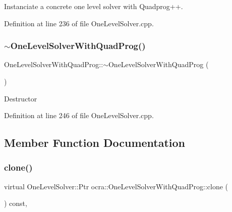 Instanciate a concrete one level solver with Quadprog++. 

Definition at line 236 of file One\+Level\+Solver.\+cpp.

\hypertarget{classocra_1_1OneLevelSolverWithQuadProg_a27d12b82fcaec15ca7041064bd7f9095}{}\label{classocra_1_1OneLevelSolverWithQuadProg_a27d12b82fcaec15ca7041064bd7f9095} 
\subsubsection{\texorpdfstring{$\sim$\+One\+Level\+Solver\+With\+Quad\+Prog()}{~OneLevelSolverWithQuadProg()}}
{\footnotesize\ttfamily One\+Level\+Solver\+With\+Quad\+Prog\+::$\sim$\+One\+Level\+Solver\+With\+Quad\+Prog (\begin{DoxyParamCaption}{ }\end{DoxyParamCaption})\hspace{0.3cm}{\ttfamily [virtual]}}

Destructor 

Definition at line 246 of file One\+Level\+Solver.\+cpp.



\subsection{Member Function Documentation}
\hypertarget{classocra_1_1OneLevelSolverWithQuadProg_a706e7772885ae7ab3e78565d51286eac}{}\label{classocra_1_1OneLevelSolverWithQuadProg_a706e7772885ae7ab3e78565d51286eac} 
\subsubsection{\texorpdfstring{clone()}{clone()}}
{\footnotesize\ttfamily virtual One\+Level\+Solver\+::\+Ptr ocra\+::\+One\+Level\+Solver\+With\+Quad\+Prog\+::clone (\begin{DoxyParamCaption}{ }\end{DoxyParamCaption}) const\hspace{0.3cm}{\ttfamily [inline]}, {\ttfamily [virtual]}}


